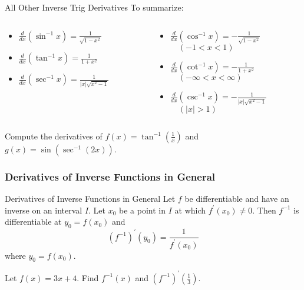 \documentclass[cal1spr16Lectures.tex]{subfiles}
\begin{document}
\begin{frame}{\small All Other Inverse Trig Derivatives}
To summarize:
\begin{columns}
\begin{column}{0.45\textwidth}
	\begin{itemize}
	\item[]$\textstyle\frac{d}{dx}(\sin^{-1}x)=\frac{1}{\sqrt{1-x^2}}$
	\item[]$\textstyle\frac{d}{dx}(\tan^{-1}x)=\frac{1}{1+x^2}$ 
	\item[]$\textstyle\frac{d}{dx}(\sec^{-1}x)=\frac{1}{|x|\sqrt{x^2-1}}$ 
	\end{itemize}
\end{column}
\begin{column}{0.6\textwidth}
	\begin{itemize}
	\item[] \alert{$\textstyle\frac{d}{dx}(\cos^{-1}x)=-\frac{1}{\sqrt{1-x^2}}$} \\
	$\quad (-1<x<1)$ 
	\item[] \alert{$\textstyle\frac{d}{dx}(\cot^{-1}x)=-\frac{1}{1+x^2}$} \\
	$\quad (-\infty<x<\infty) $ 
	\item[] \alert{$\textstyle\frac{d}{dx}(\csc^{-1}x)=-\frac{1}{|x|\sqrt{x^2-1}}$} \\
	$\quad (|x|>1)$ 
	\end{itemize}
\end{column}
\end{columns}
\end{frame}

\begin{frame}
\begin{ex} Compute the derivatives of $f(x)=\tan^{-1}\left(\textstyle\frac{1}{x}\right)$ and $g(x)=\sin \left(\sec^{-1}(2x) \right)$. \end{ex}
\end{frame}

\subsubsection{Derivatives of Inverse Functions in General}

\begin{frame}{\small Derivatives of Inverse Functions in General}\footnotesize
Let $f$ be differentiable and have an inverse on an interval $I$.  Let $x_0$ be a point in $I$ at which $f^{\prime}(x_0)\ne0$.  Then $f^{-1}$ is differentiable at $y_0=f(x_0)$ and 
\[\left(f^{-1}\right)^{\prime}(y_0)=\frac{1}{f^{\prime}(x_0)}\]
where $y_0=f(x_0)$.
\begin{ex} Let $f(x)=3x+4$.  Find $f^{-1}(x)$ and $\left(f^{-1}\right)^{\prime}\left(\textstyle\frac{1}{3}\right)$. \end{ex}
\end{frame}
\end{document}
